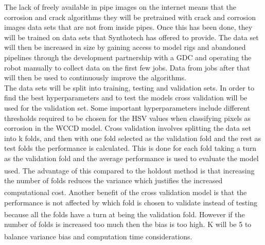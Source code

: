\documentclass[11pt]{article}		%
\newcommand{\supercite}[1]{\textsuperscript{\cite{#1}}}		%
\begin{document}
        The lack of freely available in pipe images on the internet means that %
       the corrosion and crack algorithms they will be pretrained with crack and corrosion images data sets that are not from inside pipes. %
       Once this has been done, they will be trained on data sets that Synthotech has offered to provide. The data set will then be increased in size by gaining access to model rigs and abandoned pipelines through the development partnership with a GDC and operating the robot manually to collect data on the first few jobs. Data from jobs after that will then be used to continuously improve the algorithms. %
	    \\
        \hspace*{3ex}The data sets will be split into training, testing and validation sets. In order to find the best hyperparameters and to test the models cross validation will be used for the validation set. Some important hyperparameters include different thresholds required to be chosen for the HSV values when classifying pixels as corrosion in the WCCD model. Cross validation involves splitting the data set into k folds, and then with one fold selected as the validation fold and the rest as test folds the performance is calculated. This is done for each fold taking a turn as the validation fold and the average performance is used to evaluate the model used.\supercite{Cross_Validation} The advantage of this compared to the holdout method is that increasing the number of folds reduces the variance which justifies the increased computational cost.\supercite{Cross_Validation} Another benefit of the cross validation model is that the performance is not affected by which fold is chosen to validate instead of testing because all the folds have a turn at being the validation fold.\supercite{Cross_Validation2} However if the number of folds is increased too much then the bias is too high. K will be 5 to balance variance bias and computation time considerations.\supercite{Cross_Validation_Tradeoff}
	       
	       
\end{document}
